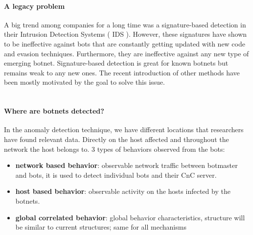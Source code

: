 \paragraph{A legacy problem} A big trend among companies for a long time was a signature-based detection in their Intrusion Detection Systems ( IDS )\cite{bot-ml}. However, these signatures have shown to be ineffective against bots that are constantly getting updated with new code and evasion techniques. Furthermore, they are ineffective against any new type of emerging botnet. Signature-based detection is great for known botnets but remains weak to any new ones\cite{snort}. The recent introduction of other methods have been mostly motivated by the goal to solve this issue.
\\\\
\paragraph{Where are botnets detected?} In the anomaly detection technique, we have different locations that researchers have found relevant data. Directly on the host affected and throughout the network the host belongs to.
3 types of behaviors observed from the bots\cite{bot-threat1}:
\begin{itemize}
\item \textbf{network based behavior}: observable network traffic between botmaster and bots, it is used to detect individual bots and their CnC server. 
\item \textbf{host based behavior}: observable activity on the hosts infected by the botnets. 
\item \textbf{global correlated behavior}: global behavior characteristics, structure will be similar to current structures; same for all mechanisms
\end{itemize}
